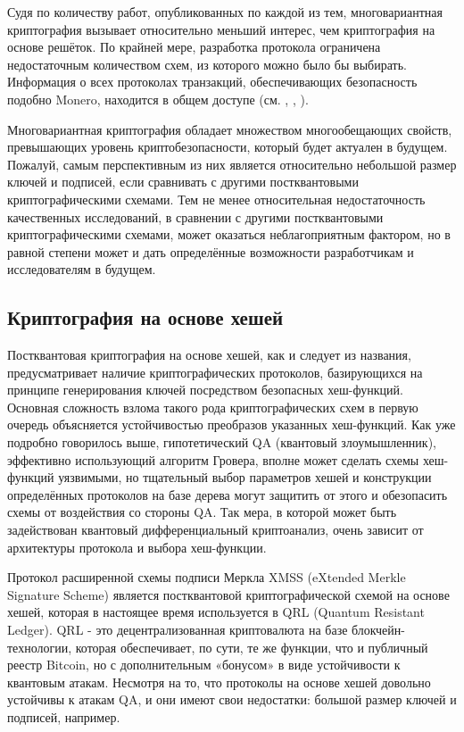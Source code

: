 \documentclass{mrl}
\begin{document}
Судя по количеству работ, опубликованных по каждой из тем, многовариантная криптография вызывает относительно меньший интерес, чем криптография на основе решёток. По крайней мере, разработка протокола ограничена недостаточным количеством схем, из которого можно было бы выбирать. Информация о всех протоколах транзакций, обеспечивающих безопасность подобно Monero, находится в общем доступе (см. \cite{esgin2019matrict}, \cite{torres2018post}, \cite{torres2019lattice}). 

Многовариантная криптография обладает множеством многообещающих свойств, превышающих уровень криптобезопасности, который будет актуален в будущем. Пожалуй, самым перспективным из них является относительно небольшой размер ключей и подписей, если сравнивать с другими постквантовыми криптографическими схемами. Тем не менее относительная недостаточность качественных исследований, в сравнении с другими постквантовыми криптографическими схемами, может оказаться неблагоприятным фактором, но в равной степени может и дать определённые возможности разработчикам и исследователям в будущем.

\subsection{Криптография на основе хешей}

Постквантовая криптография на основе хешей, как и следует из названия, предусматривает наличие криптографических протоколов, базирующихся на принципе генерирования ключей посредством безопасных хеш-функций. Основная сложность взлома такого рода криптографических схем в первую очередь объясняется устойчивостью преобразов указанных хеш-функций. Как уже подробно говорилось выше, гипотетический QA (квантовый злоумышленник), эффективно использующий алгоритм Гровера, вполне может сделать схемы хеш-функций уязвимыми, но тщательный выбор параметров хешей и конструкции определённых протоколов на базе дерева могут защитить от этого и обезопасить схемы от воздействия со стороны QA. Так мера, в которой может быть задействован квантовый дифференциальный криптоанализ, очень зависит от архитектуры протокола и выбора хеш-функции.

Протокол расширенной схемы подписи Меркла XMSS (eXtended Merkle Signature Scheme) является постквантовой криптографической схемой на основе хешей, которая в настоящее время используется в QRL (Quantum Resistant Ledger). QRL - это децентрализованная криптовалюта на базе блокчейн-технологии, которая обеспечивает, по сути, те же функции, что и публичный реестр Bitcoin, но с дополнительным «бонусом» в виде устойчивости к квантовым атакам. Несмотря на то, что протоколы на основе хешей довольно устойчивы к атакам QA, и они имеют свои недостатки: большой размер ключей и подписей, например.
\end{document}
